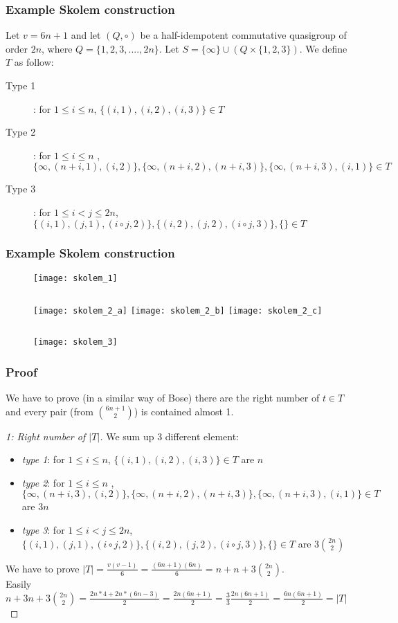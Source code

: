 \begin{frame}
\frametitle{Example Skolem construction}
Let $v = 6n +1$ and let $(Q, \circ)$ be a half-idempotent commutative quasigroup of order $2n$, where $Q = \{ 1,2,3,...., 2n\}$. Let $S = \{\infty\} \cup(Q \times \{1,2,3\})$. We define $T$ as follow:

\begin{description}
	\item[Type 1]: for $1 \le i \le n$, $\{ (i,1), (i,2), (i,3) \} \in T$ 
	\item[Type 2]: for $1 \le i \le n$ , $\{ \infty, (n+i,1),(i,2) \},\{ \infty, (n+i,2),(n+i,3) \},\{\infty,(n+i,3),(i,1) \} \in T$
	\item[Type 3]: for $1 \le i < j \le 2n$,$\{(i,1),(j,1),(i \circ j,2) \}, \{(i,2),(j,2),(i \circ j,3)\},\{\} \in T$
\end{description}
\end{frame}

\begin{frame}
\frametitle{Example Skolem construction}
\begin{figure}
	\texttt{[image: skolem\_1]}
	\begin{columns}
		\texttt{[image: skolem\_2\_a]}
		\texttt{[image: skolem\_2\_b]}
		\texttt{[image: skolem\_2\_c]}
	\end{columns}
	\texttt{[image: skolem\_3]}
\end{figure}
\end{frame}


\begin{frame}
\frametitle{Proof}
We have to prove (in a similar way of Bose) there are the right number of $t \in T$ and every pair (from $\binom{6n + 1}{2}$) is contained almost 1.
\begin{proof}[1: Right number of $|T|$]
We sum up 3 different element:
\small
\begin{itemize}
	\item \textit{type 1}: \textcolor{black!55}{for $1 \le i \le n$, $\{ (i,1), (i,2), (i,3)\} \in T$} are $n$
	\item \textit{type 2}: \textcolor{black!55}{ for $1 \le i \le n$ , $\{\infty, (n+i,3),(i,2)\},\{\infty,(n+i,2),(n+i,3)\},\{\infty,(n+i,3),(i,1) \} \in T$} are $3n$
	\item \textit{type 3}: \textcolor{black!55}{for $1 \le i < j \le 2n$,$\{(i,1),(j,1),(i \circ j,2) \}, \{(i,2),(j,2),(i \circ j,3)\},\{\} \in T$} are $3\binom{2n}{2}$
\end{itemize}
We have to prove $|T|= \frac{v(v-1)}{6} = \frac{(6n+1)(6n)}{6}= n + n + 3\binom{2n}{2}$.\\
Easily $n + 3n + 3\binom{2n}{2}=\frac{2n*4+ 2n*(6n-3)}{2}= \frac{2n(6n +1 )}{2}= \frac{3}{3}\frac{2n(6n +1 )}{2}=\frac{6n(6n +1 )}{2}=|T|$
\end{proof}
\end{frame}

